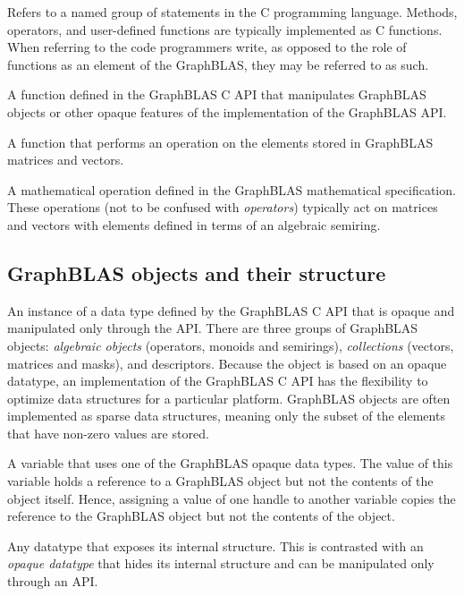  Refers to a named group of statements in the C programming language.  Methods, operators,
and user-defined functions are typically implemented as C functions.
When referring to 
the code programmers write, as opposed to the role of functions as an element of the GraphBLAS, they may
be referred to as such.

 A function defined in the GraphBLAS C API that manipulates
GraphBLAS objects or other opaque features of the implementation of the GraphBLAS API.

 A function that performs an operation on the elements stored in GraphBLAS matrices and vectors.

 A mathematical operation defined in the
GraphBLAS mathematical specification. These operations (not to be confused with \emph{operators}) typically act
on matrices and vectors with elements defined in terms of an algebraic semiring. 
\glossEnd

\subsection{GraphBLAS objects and their structure}

\glossBegin
{}  An instance of a data type defined by the GraphBLAS C
API that is opaque and manipulated only through the API. There are three groups of 
GraphBLAS objects: \emph{algebraic objects} (operators, monoids and semirings), 
\emph{collections} (vectors, matrices and masks), and descriptors.   Because the object
is based on an opaque datatype, an implementation of the GraphBLAS C API has the
flexibility to optimize data structures for a particular platform.  GraphBLAS objects
are often implemented as sparse data structures, meaning only the subset of the
elements that have non-zero values are stored.

  A variable that uses one of the GraphBLAS opaque data types.
The value of this variable holds a reference to a GraphBLAS object but not the contents of the object itself.
Hence, assigning a value of one handle to another variable copies the reference to the GraphBLAS object
but not the contents of the object.

 Any datatype that exposes its internal structure.   
This is contrasted
with an \emph{opaque datatype} that hides its internal structure and can
be manipulated only through an API.

